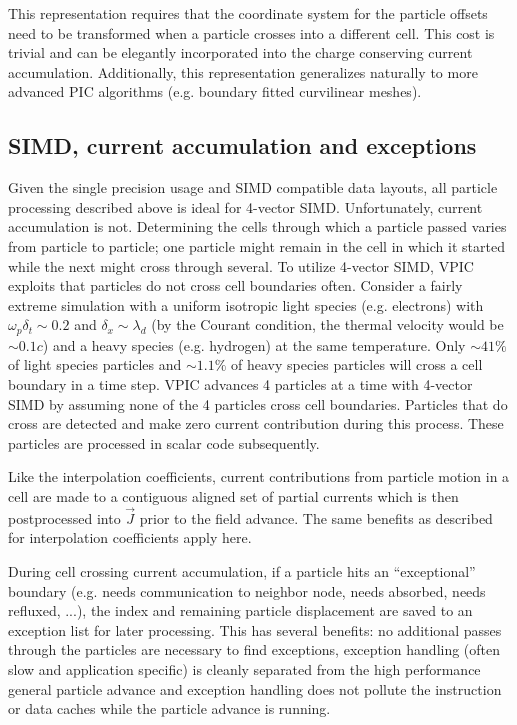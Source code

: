 \documentclass[aps,prl,preprint,preprintnumbers,groupedaddress]{revtex4}
\newcommand{\vecJ}{\vec{J}}
\begin{document}
This representation requires that the coordinate system for the
particle offsets need to be transformed when a particle crosses into a
different cell.  This cost is trivial and can be elegantly
incorporated into the charge conserving current accumulation.
Additionally, this representation generalizes naturally to more
advanced PIC algorithms (e.g. boundary fitted curvilinear meshes).

\subsection{SIMD, current accumulation and exceptions}

Given the single precision usage and SIMD compatible data layouts, all
particle processing described above is ideal for 4-vector SIMD.
Unfortunately, current accumulation is not.  Determining the cells
through which a particle passed varies from particle to particle; one
particle might remain in the cell in which it started while the next
might cross through several.  To utilize 4-vector SIMD, VPIC exploits
that particles do not cross cell boundaries often.  Consider a fairly
extreme simulation with a uniform isotropic light species
(e.g. electrons) with $\omega_p \delta_t \sim 0.2$ and $\delta_x \sim
\lambda_d$ (by the Courant condition, the thermal velocity would be
$\sim 0.1c$) and a heavy species (e.g. hydrogen) at the same
temperature.  Only $\sim 41\%$ of light species particles and $\sim
1.1\%$ of heavy species particles will cross a cell boundary in a time
step.  VPIC advances 4 particles at a time with 4-vector SIMD by
assuming none of the 4 particles cross cell boundaries.  Particles
that do cross are detected and make zero current contribution during
this process.  These particles are processed in scalar code
subsequently.

Like the interpolation coefficients, current contributions from
particle motion in a cell are made to a contiguous aligned set of
partial currents which is then postprocessed into $\vecJ$ prior to the
field advance.  The same benefits as described for interpolation
coefficients apply here.

During cell crossing current accumulation, if a particle hits an
``exceptional'' boundary (e.g. needs communication to neighbor node,
needs absorbed, needs refluxed, ...), the index and remaining particle
displacement are saved to an exception list for later processing.
This has several benefits: no additional passes through the particles
are necessary to find exceptions, exception handling (often slow and
application specific) is cleanly separated from the high performance
general particle advance and exception handling does not pollute the
instruction or data caches while the particle advance is running.
\end{document}
